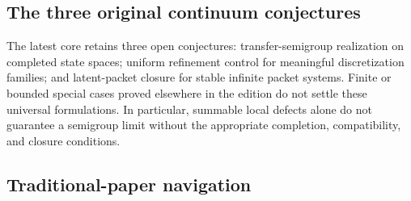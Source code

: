 \subsection{The three original continuum conjectures}
The latest core retains three open conjectures: transfer-semigroup realization on completed state spaces; uniform refinement control for meaningful discretization families; and latent-packet closure for stable infinite packet systems. Finite or bounded special cases proved elsewhere in the edition do not settle these universal formulations. In particular, summable local defects alone do not guarantee a semigroup limit without the appropriate completion, compatibility, and closure conditions.

\subsection{Traditional-paper navigation}

